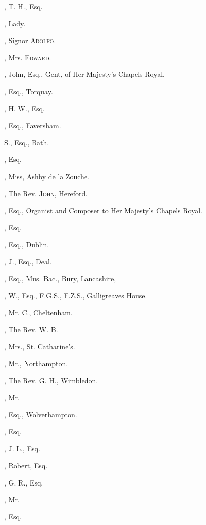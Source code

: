 \begin{multicols}{2}
, T. H., Esq.

, Lady.

, Signor \textsc{Adolfo}.

, Mrs. \textsc{Edward}.

, John, Esq., Gent, of Her Majesty’s
Chapels Royal.

, Esq., Torquay.
\bigskip

, H. W., Esq.

, Esq., Faversham.

 S., Esq., Bath.

, Esq.

, Miss, Ashby de la Zouche.

, The Rev. \textsc{John}, Hereford.

, Esq., Organist and Composer
to Her Majesty’s Chapels Royal.

, Esq.
\bigskip

, Esq., Dublin.

, J., Esq., Deal.

, Esq., Mus. Bac., Bury,
Lancashire,

, W., Esq., F.G.S., F.Z.S., Galligreaves
House.

, Mr. C., Cheltenham.

, The Rev. W. B.

, Mrs., St. Catharine’s.

, Mr., Northampton.

, The Rev. G. H., Wimbledon.

, Mr.

, Esq., Wolverhampton.

, Esq.

, J. L., Esq.

, Robert, Esq.

, G. R., Esq.

, Mr.

, Esq.


\end{multicols}
